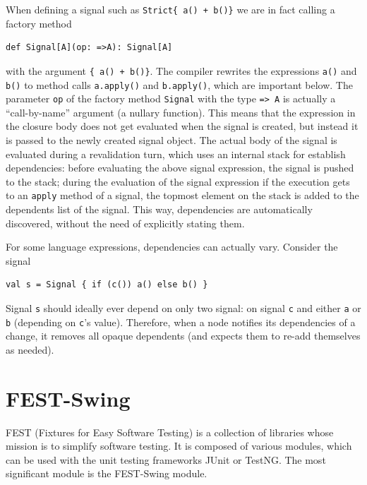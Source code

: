 When defining a signal such as \texttt{Strict\{ a() + b()\}} we are in fact calling a factory method 
\begin{lstlisting}
def Signal[A](op: =>A): Signal[A]
\end{lstlisting}
with the argument \texttt{\{ a() + b()\}}. The compiler rewrites the expressions \texttt{a()} and \texttt{b()} to method calls \texttt{a.apply()} and \texttt{b.apply()}, which are important below. The parameter \texttt{op} of the factory method \texttt{Signal} with the type \texttt{=> A} is actually a ``call-by-name'' argument (a nullary function). This means that the expression in the closure body does not get evaluated when the signal is created, but instead it is passed to the newly created signal object. The actual body of the signal is evaluated during a revalidation turn, which uses an internal stack for establish dependencies: before evaluating the above signal expression, the signal is pushed to the stack; during the evaluation of the signal expression if the execution gets to an \texttt{apply} method of a signal, the topmost element on the stack is added to the dependents list of the signal. This way, dependencies are automatically discovered, without the need of explicitly stating them.

For some language expressions, dependencies can actually vary. Consider the signal
\begin{lstlisting}
val s = Signal { if (c()) a() else b() }
\end{lstlisting}
Signal \texttt{s} should ideally ever depend on only two signal: on signal \texttt{c} and either \texttt{a} or \texttt{b} (depending on \texttt{c}'s value). Therefore, when a node notifies its dependencies of a change, it removes all opaque dependents (and expects them to re-add themselves as needed).








\section{FEST-Swing}\label{sec:theory_fest-swing}

FEST (Fixtures for Easy Software Testing) is a collection of libraries whose mission is to simplify software testing. It is composed of various modules, which can be used with the unit testing frameworks JUnit \cite{JUnit} or TestNG. The most significant module is the FEST-Swing module.

